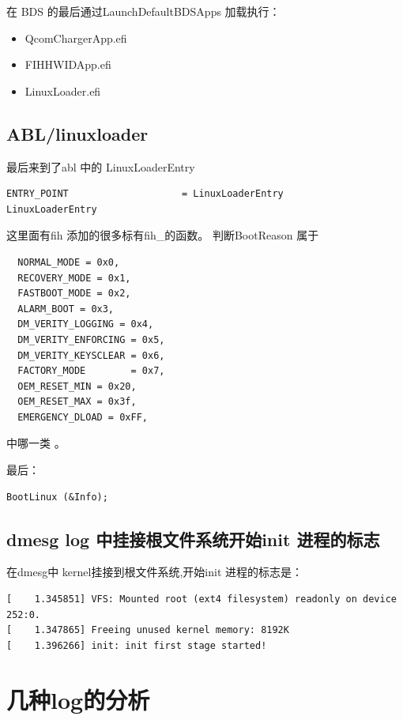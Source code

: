 在 BDS 的最后通过LaunchDefaultBDSApps 加载执行：
\begin{itemize}
\item QcomChargerApp.efi

\item FIHHWIDApp.efi

\item LinuxLoader.efi 

\end{itemize}



\subsection{ABL/linuxloader }
最后来到了abl 中的 LinuxLoaderEntry
\begin{lstlisting}
ENTRY_POINT                    = LinuxLoaderEntry
LinuxLoaderEntry
\end{lstlisting}

这里面有fih 添加的很多标有fih\_的函数。
判断BootReason 属于
\begin{lstlisting} 
  NORMAL_MODE = 0x0,
  RECOVERY_MODE = 0x1,
  FASTBOOT_MODE = 0x2,
  ALARM_BOOT = 0x3,
  DM_VERITY_LOGGING = 0x4,
  DM_VERITY_ENFORCING = 0x5,
  DM_VERITY_KEYSCLEAR = 0x6,
  FACTORY_MODE        = 0x7,
  OEM_RESET_MIN = 0x20,
  OEM_RESET_MAX = 0x3f,
  EMERGENCY_DLOAD = 0xFF,
\end{lstlisting}
中哪一类 。
  
最后：
\begin{lstlisting}  
BootLinux (&Info);
\end{lstlisting}

  
\subsection{ dmesg log 中挂接根文件系统开始init 进程的标志 }

在dmesg中 kernel挂接到根文件系统,开始init 进程的标志是：
\begin{lstlisting}
[    1.345851] VFS: Mounted root (ext4 filesystem) readonly on device 252:0.
[    1.347865] Freeing unused kernel memory: 8192K
[    1.396266] init: init first stage started!
\end{lstlisting}





\section{几种log的分析}


